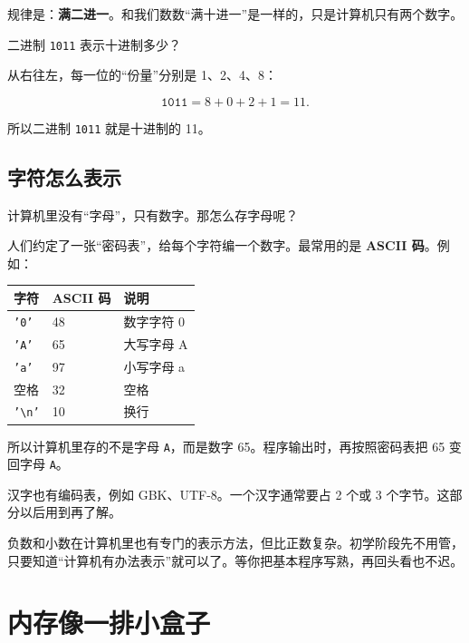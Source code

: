 规律是：\textbf{满二进一}。和我们数数“满十进一”是一样的，只是计算机只有两个数字。

\begin{example}
二进制 \texttt{1011} 表示十进制多少？
\end{example}
\begin{solution}
从右往左，每一位的“份量”分别是 1、2、4、8：

\[
\texttt{1011} = 8 + 0 + 2 + 1 = 11.
\]

所以二进制 \texttt{1011} 就是十进制的 11。
\end{solution}

\subsection{字符怎么表示}

计算机里没有“字母”，只有数字。那怎么存字母呢？

人们约定了一张“密码表”，给每个字符编一个数字。最常用的是 \textbf{ASCII 码}。例如：

\begin{center}
\begin{tabular}{@{}lll@{}}
\toprule
字符 & ASCII 码 & 说明 \\
\midrule
\texttt{'0'} & 48 & 数字字符 0 \\
\texttt{'A'} & 65 & 大写字母 A \\
\texttt{'a'} & 97 & 小写字母 a \\
空格 & 32 & 空格 \\
\texttt{'\textbackslash n'} & 10 & 换行 \\
\bottomrule
\end{tabular}
\end{center}

所以计算机里存的不是字母 \texttt{A}，而是数字 65。程序输出时，再按照密码表把 65 变回字母 \texttt{A}。

汉字也有编码表，例如 GBK、UTF-8。一个汉字通常要占 2 个或 3 个字节。这部分以后用到再了解。

\begin{tipbox}[负数和小数怎么办？]
负数和小数在计算机里也有专门的表示方法，但比正数复杂。初学阶段先不用管，只要知道“计算机有办法表示”就可以了。等你把基本程序写熟，再回头看也不迟。
\end{tipbox}

\section{内存像一排小盒子}

